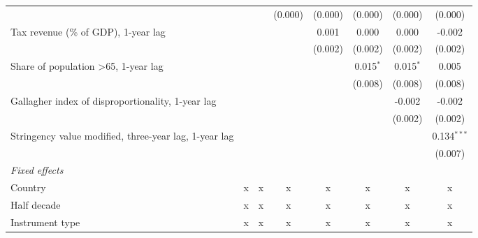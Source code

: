 \begin{tabular}{lccccccc}
                                                                     &               &               & (0.000)       & (0.000)       & (0.000)      & (0.000)      & (0.000)\\   
   Tax revenue (\% of GDP), 1-year lag                               &               &               &               & 0.001         & 0.000        & 0.000        & -0.002\\   
                                                                     &               &               &               & (0.002)       & (0.002)      & (0.002)      & (0.002)\\   
   Share of population >65, 1-year lag                               &               &               &               &               & 0.015$^{*}$  & 0.015$^{*}$  & 0.005\\   
                                                                     &               &               &               &               & (0.008)      & (0.008)      & (0.008)\\   
   Gallagher index of disproportionality, 1-year lag                 &               &               &               &               &              & -0.002       & -0.002\\   
                                                                     &               &               &               &               &              & (0.002)      & (0.002)\\   
   Stringency value modified, three-year lag, 1-year lag             &               &               &               &               &              &              & 0.134$^{***}$\\   
                                                                     &               &               &               &               &              &              & (0.007)\\   
   \emph{Fixed effects}\\
   Country                                                           & x             & x             & x             & x             & x            & x            & x\\  
   Half decade                                                       & x             & x             & x             & x             & x            & x            & x\\  
   Instrument type                                                   & x             & x             & x             & x             & x            & x            & x\\  

\end{tabular}
